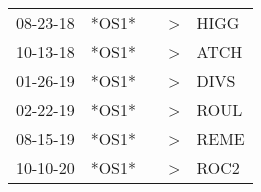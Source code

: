 \begin{supertabular}{p{0.07\textwidth}p{0.06\textwidth}p{0.02\textwidth}p{0.02\textwidth}p{0.06\textwidth}}
 08-23-18\textsuperscript{} &                   *OS1* &    &     \textgreater &           HIGG\textsuperscript{} \\
 10-13-18\textsuperscript{} &                   *OS1* &    &     \textgreater &           ATCH\textsuperscript{} \\
 01-26-19\textsuperscript{} &                   *OS1* &    &     \textgreater &           DIVS\textsuperscript{} \\
 02-22-19\textsuperscript{} &                   *OS1* &    &     \textgreater &           ROUL\textsuperscript{} \\
 08-15-19\textsuperscript{} &                   *OS1* &    &     \textgreater &           REME\textsuperscript{} \\
 10-10-20\textsuperscript{} &                   *OS1* &    &     \textgreater &           ROC2\textsuperscript{} \\
\end{supertabular}
